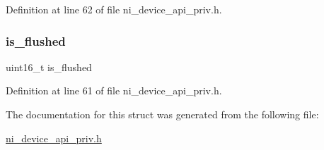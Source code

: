 Definition at line 62 of file ni\+\_\+device\+\_\+api\+\_\+priv.\+h.

\mbox{\label{struct__ni__instance__mgr__stream__complete_a53f8d848132d487dcb862de1e6ccbac7}} 
\subsubsection{\texorpdfstring{is\_flushed}{is\_flushed}}
{\footnotesize\ttfamily uint16\+\_\+t is\+\_\+flushed}



Definition at line 61 of file ni\+\_\+device\+\_\+api\+\_\+priv.\+h.



The documentation for this struct was generated from the following file\+:\begin{DoxyCompactItemize}
\item 
\mbox{\hyperlink{ni__device__api__priv_8h}{ni\+\_\+device\+\_\+api\+\_\+priv.\+h}}\end{DoxyCompactItemize}
